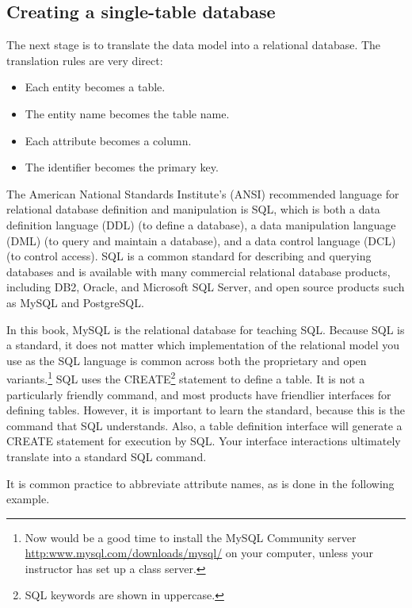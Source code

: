 \documentclass[
]{article}
\begin{document}
\hypertarget{creating-a-single-table-database}{%
\subsection*{Creating a single-table database}\label{creating-a-single-table-database}}

The next stage is to translate the data model into a relational database. The translation rules are very direct:

\begin{itemize}
\item
  Each entity becomes a table.
\item
  The entity name becomes the table name.
\item
  Each attribute becomes a column.
\item
  The identifier becomes the primary key.
\end{itemize}

The American National Standards Institute's (ANSI) recommended language for relational database definition and manipulation is SQL, which is both a data definition language (DDL) (to define a database), a data manipulation language (DML) (to query and maintain a database), and a data control language (DCL) (to control access). SQL is a common standard for describing and querying databases and is available with many commercial relational database products, including DB2, Oracle, and Microsoft SQL Server, and open source products such as MySQL and PostgreSQL.

In this book, MySQL is the relational database for teaching SQL. Because SQL is a standard, it does not matter which implementation of the relational model you use as the SQL language is common across both the proprietary and open variants.\footnote{Now would be a good time to install the MySQL Community server \url{http:www.mysql.com/downloads/mysql/} on your computer, unless your instructor has set up a class server.} SQL uses the CREATE\footnote{SQL keywords are shown in uppercase.} statement to define a table. It is not a particularly friendly command, and most products have friendlier interfaces for defining tables. However, it is important to learn the standard, because this is the command that SQL understands. Also, a table definition interface will generate a CREATE statement for execution by SQL. Your interface interactions ultimately translate into a standard SQL command.

It is common practice to abbreviate attribute names, as is done in the following example.
\end{document}
